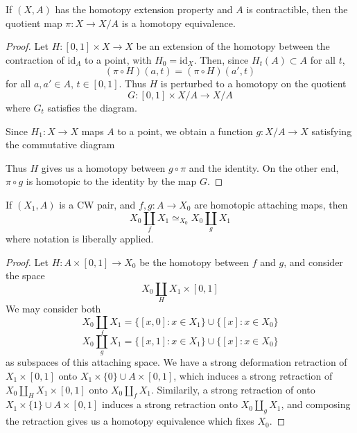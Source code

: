 \begin{theorem}
    If $(X,A)$ has the homotopy extension property and $A$ is contractible, then the quotient map $\pi:X \to X/A$ is a homotopy equivalence.
\end{theorem}
\begin{proof}
    Let $H: [0,1] \times X \to X$ be an extension of the homotopy between the contraction of $\text{id}_A$ to a point, with $H_0 = \text{id}_X$. Then, since $H_t(A) \subset A$ for all $t$,
    \[ (\pi \circ H)(a,t) = (\pi \circ H)(a',t) \]
    for all $a,a' \in A$, $t \in [0,1]$. Thus $H$ is perturbed to a homotopy on the quotient
    \[ G: [0,1] \times X/A \to X/A \]
    where $G_t$ satisfies the diagram.
    \begin{center}
    \end{center}
    Since $H_1: X \to X$ maps $A$ to a point, we obtain a function $g: X/A \to X$ satisfying the commutative diagram
    \begin{center}
    \end{center}
    Thus $H$ gives us a homotopy between $g \circ \pi$ and the identity. On the other end, $\pi \circ g$ is homotopic to the identity by the map $G$.
\end{proof}

\begin{theorem}
    If $(X_1,A)$ is a CW pair, and $f,g : A \to X_0$ are homotopic attaching maps, then
    \[ X_0 \coprod_f X_1 \simeq_{X_0} X_0 \coprod_g X_1 \]
    where notation is liberally applied.
\end{theorem}
\begin{proof}
    Let $H: A \times [0,1] \to X_0$ be the homotopy between $f$ and $g$, and consider the space
    \[ X_0 \coprod_H X_1 \times [0,1] \]
    We may consider both
    \[ X_0 \coprod_f X_1 = \{ [x,0] : x \in X_1 \} \cup \{ [x] : x \in X_0 \} \]
    \[ X_0 \coprod_g X_1 = \{ [x,1] : x \in X_1 \} \cup \{ [x]: x \in X_0 \} \]
    as subspaces of this attaching space. We have a strong deformation retraction of $X_1 \times [0,1]$ onto $X_1 \times \{ 0 \} \cup A \times [0,1]$, which induces a strong retraction of $X_0 \coprod_H X_1 \times [0,1]$ onto $X_0 \coprod_f X_1$. Similarily, a strong retraction of onto $X_1 \times \{ 1 \} \cup A \times [0,1]$ induces a strong retraction onto $X_0 \coprod_g X_1$, and composing the retraction gives us a homotopy equivalence which fixes $X_0$.
\end{proof}


